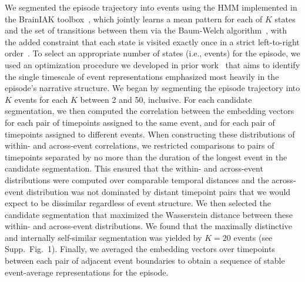 \documentclass[10pt]{article}
\newcommand{\kOptimization}{1}
\begin{document}
We segmented the episode trajectory into events using the HMM implemented in the BrainIAK toolbox~\citep{KumaEtal21}, which jointly learns a mean pattern for each of $K$ states and the set of transitions between them via the Baum-Welch algorithm~\citep{BaumEtal70}, with the added constraint that each state is visited exactly once in a strict left-to-right order~\citep{BaldEtal17}.
To select an appropriate number of states (i.e., events) for the episode, we used an optimization procedure we developed in prior work~\citep{HeusEtal21} that aims to identify the single timescale of event representations emphasized most heavily in the episode's narrative structure.
We began by segmenting the episode trajectory into $K$ events for each $K$ between 2 and 50, inclusive.
For each candidate segmentation, we then computed the correlation between the embedding vectors for each pair of timepoints assigned to the same event, and for each pair of timepoints assigned to different events.
When constructing these distributions of within- and across-event correlations, we restricted comparisons to pairs of timepoints separated by no more than the duration of the longest event in the candidate segmentation.
This ensured that the within- and across-event distributions were computed over comparable temporal distances and the across-event distribution was not dominated by distant timepoint pairs that we would expect to be dissimilar regardless of event structure.
We then selected the candidate segmentation that maximized the Wasserstein distance between these within- and across-event distributions.
We found that the maximally distinctive and internally self-similar segmentation was yielded by $K = 20$ events (see Supp.~Fig.~\kOptimization).
Finally, we averaged the embedding vectors over timepoints between each pair of adjacent event boundaries to obtain a sequence of stable event-average representations for the episode.
\end{document}
